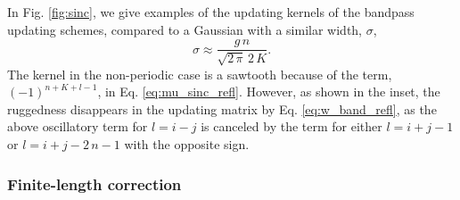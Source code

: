 \documentclass[reprint, superscriptaddress, floatfix]{revtex4-1}
\begin{document}
In Fig. \ref{fig:sinc},
we give examples of the updating kernels
of the bandpass updating schemes,
compared to a Gaussian
with a similar width, $\sigma$,
%
\begin{equation}
  \sigma
  \approx
  \frac
  {
    g \, n
  }
  {
    \sqrt{ 2 \, \pi } \, 2 \, K
  }
  .
\label{eq:sigma_equiv}
\end{equation}
%
%
The kernel in the non-periodic case is a sawtooth
because of the term, $(-1)^{n+K+l-1}$,
in Eq. \eqref{eq:mu_sinc_refl}.
%
However, as shown in the inset, %
the ruggedness disappears
in the updating matrix by Eq. \eqref{eq:w_band_refl},
as the above oscillatory term for $l = i - j$
is canceled by the term for either $l = i + j - 1$
or $l = i + j - 2 \, n - 1$
with the opposite sign.



\subsubsection{\label{sec:finlencorr}
Finite-length correction}
\end{document}
